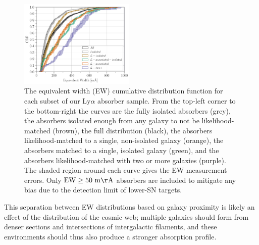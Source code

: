 \documentclass[twocolumn,tighten]{aastex62}
\begin{document}
\begin{figure}[t!]
        \centering
        \vspace{15pt}
        \includegraphics[width=0.49\textwidth]{hist(EW)_bins10_6_EWcut50-15000_err_dataset_double.pdf}
        \caption{\small{The equivalent width (EW) cumulative distribution function for each subset of our Ly$\alpha$ absorber sample. From the top-left corner to the bottom-right the curves are the fully isolated absorbers (grey), the absorbers isolated enough from any galaxy to not be likelihood-matched (brown), the full distribution (black), the absorbers likelihood-matched to a single, non-isolated galaxy (orange), the absorbers matched to a single, isolated galaxy (green), and the absorbers likelihood-matched with two or more galaxies (purple). The shaded region around each curve gives the EW measurement errors. Only $\rm EW \ge 50~m\AA$ absorbers are included to mitigate any bias due to the detection limit of lower-SN targets.}}
        \vspace{5pt}
        \label{cdf_ew}
\end{figure}

This separation between EW distributions based on galaxy proximity is likely an effect of the distribution of the cosmic web; multiple galaxies should form from denser sections and intersections of intergalactic filaments, and these environments should thus also produce a stronger absorption profile. 
\end{document}
